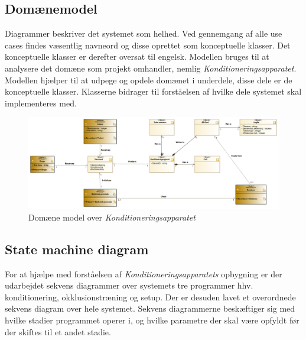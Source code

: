 \subsection{Domænemodel}
Diagrammer beskriver det systemet som helhed. Ved gennemgang af alle use cases findes væsentlig navneord og disse oprettet som konceptuelle klasser. Det konceptuelle klasser er derefter oversat til engelsk. Modellen bruges til at analysere det domæne som projekt omhandler, nemlig \textit{Konditioneringsapparatet}. Modellen hjælper til at udpege og opdele domænet i underdele, disse dele er de konceptuelle klasser.  Klasserne bidrager til forståelsen af hvilke dele systemet skal implementeres med.  \\
\begin{figure}[H]
	\includegraphics[width=\textwidth]{SystemArkitektur/pdfs/DomainModel.png}
	\caption{Domæne model over \textit{Konditioneringsapparatet}}
\end{figure}


\newpage
\subsection{State machine diagram}
For at hjælpe med forståelsen af \textit{Konditioneringsapparatets} opbygning er der udarbejdet sekvens diagrammer over systemets tre programmer hhv. konditionering, okklusionstræning og setup. Der er desuden lavet et overordnede sekvens diagram over hele systemet. 
Sekvens diagrammerne beskæftiger sig med hvilke stadier programmet operer i, og hvilke parametre der skal være opfyldt før der skiftes til et andet stadie. 
 
